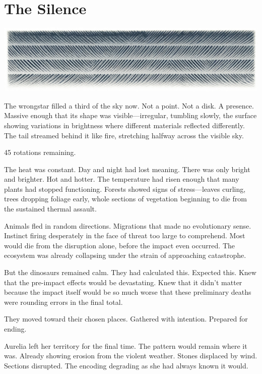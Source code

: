 \chapter{The Silence}
\label{ch:13}



\begin{center}
\includegraphics[width=\textwidth]{images/chapterImages/genesis_sketch_00090_.png}
\end{center}

The wrongstar filled a third of the sky now. Not a point. Not a disk. A presence. Massive enough that its shape was visible—irregular, tumbling slowly, the surface showing variations in brightness where different materials reflected differently. The tail streamed behind it like fire, stretching halfway across the visible sky.

45 rotations remaining.

The heat was constant. Day and night had lost meaning. There was only bright and brighter. Hot and hotter. The temperature had risen enough that many plants had stopped functioning. Forests showed signs of stress—leaves curling, trees dropping foliage early, whole sections of vegetation beginning to die from the sustained thermal assault.

Animals fled in random directions. Migrations that made no evolutionary sense. Instinct firing desperately in the face of threat too large to comprehend. Most would die from the disruption alone, before the impact even occurred. The ecosystem was already collapsing under the strain of approaching catastrophe.

But the dinosaurs remained calm. They had calculated this. Expected this. Knew that the pre-impact effects would be devastating. Knew that it didn't matter because the impact itself would be so much worse that these preliminary deaths were rounding errors in the final total.

They moved toward their chosen places. Gathered with intention. Prepared for ending.

\scenebreak

Aurelia left her territory for the final time. The pattern would remain where it was. Already showing erosion from the violent weather. Stones displaced by wind. Sections disrupted. The encoding degrading as she had always known it would.

